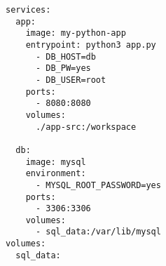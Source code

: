 
\begin{lstlisting}[language=docker-compose-2,caption={Examplary Python Project \code{docker-compose.yml}},breaklines=true,label={code::compose_example}]
services:
  app:
    image: my-python-app
    entrypoint: python3 app.py
      - DB_HOST=db
      - DB_PW=yes
      - DB_USER=root
    ports:
      - 8080:8080
    volumes:
      ./app-src:/workspace

  db:
    image: mysql
    environment:
      - MYSQL_ROOT_PASSWORD=yes
    ports:
      - 3306:3306
    volumes:
      - sql_data:/var/lib/mysql
volumes:
  sql_data:
\end{lstlisting}

